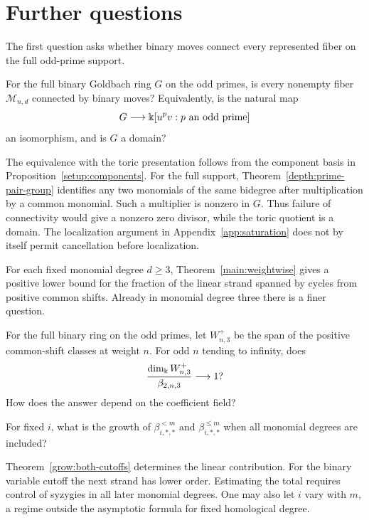 \section{Further questions}
\label{sec:questions}

The first question asks whether binary moves connect every represented
fiber on the full odd-prime support.

\begin{question}\label{question:full-support-connectivity}
For the full binary Goldbach ring $G$ on the odd primes, is every
nonempty fiber $\mathcal M_{n,d}$ connected by binary moves?
Equivalently, is the natural map
\[
 G\longrightarrow\Bbbk[u^pv:p\text{ an odd prime}]
\]
an isomorphism, and is $G$ a domain?
\end{question}
The equivalence with the toric presentation follows from the component
basis in Proposition~\ref{setup:components}. For the full support,
Theorem~\ref{depth:prime-pair-group} identifies any two monomials of
the same bidegree after multiplication by a common monomial.
Such a multiplier is nonzero in $G$. Thus failure of connectivity
would give a nonzero zero divisor, while the toric quotient is a
domain. The localization argument in Appendix~\ref{app:saturation}
does not by itself permit cancellation before localization.

For each fixed monomial degree $d\ge3$, Theorem~\ref{main:weightwise} gives a
positive lower bound for the fraction of the linear strand spanned by
cycles from positive common shifts. Already in monomial degree three there is
a finer question.

\begin{question}
For the full binary ring on the odd primes, let $W^+_{n,3}$ be the span
of the positive common-shift classes at weight $n$. For odd $n$ tending
to infinity, does
\[
 \frac{\dim_\Bbbk W^+_{n,3}}{\beta_{2,n,3}}\longrightarrow1?
\]
How does the answer depend on the coefficient field?
\end{question}

\begin{question}
For fixed $i$, what is the growth of
$\beta^{<m}_{i,*,*}$ and $\beta^{\le m}_{i,*,*}$
when all monomial degrees are included?
\end{question}
Theorem~\ref{grow:both-cutoffs} determines the linear contribution.
For the binary variable cutoff the next strand has lower order.
Estimating the total requires control of syzygies in all later
monomial degrees. One may also let $i$ vary with $m$, a regime
outside the asymptotic formula for fixed homological degree.

